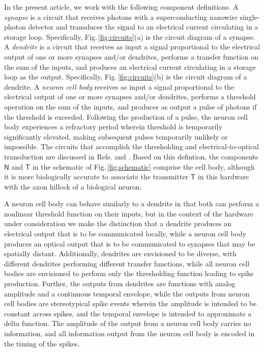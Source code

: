 \documentclass[twocolumn]{article}
\newcommand{\onlinecite}[1]{\hspace{-1 ex} \nocite{#1}\citenum{#1}}
\begin{document}
In the present article, we work with the following component definitions. A \textit{synapse} is a circuit that receives photons with a superconducting nanowire single-photon detector and transduces the signal to an electrical current circulating in a storage loop. Specifically, Fig.\,\ref{fig:circuits}(a) is the circuit diagram of a synapse. A \textit{dendrite} is a circuit that receives as input a signal proportional to the electrical output of one or more synapses and/or dendrites, performs a transfer function on the sum of the inputs, and produces an electrical current circulating in a storage loop as the output. Specifically, Fig.\,\ref{fig:circuits}(b) is the circuit diagram of a dendrite. A \textit{neuron cell body} receives as input a signal proportional to the electrical output of one or more synapses and/or dendrites, performs a threshold operation on the sum of the inputs, and produces as output a pulse of photons if the threshold is exceeded. Following the production of a pulse, the neuron cell body experiences a refractory period wherein threshold is temporarily significantly elevated, making subsequent pulses temporarily unlikely or impossible. The circuits that accomplish the thresholding and electrical-to-optical transduction are discussed in Refs.\onlinecite{sh2018} and \onlinecite{sh2018_full}. Based on this defintion, the components $\mathsf{N}$ and $\mathsf{T}$ in the schematic of Fig.\,\ref{fig:schematic} comprise the cell body, although it is more biologically accurate to associate the transmitter $\mathsf{T}$ in this hardware with the axon hillock of a biological neuron. 

A neuron cell body can behave similarly to a dendrite in that both can perform a nonlinear threshold function on their inputs, but in the context of the hardware under consideration we make the distinction that a dendrite produces an electrical output that is to be communicated locally, while a neuron cell body produces an optical output that is to be communicated to synapses that may be spatially distant. Additionally, dendrites are envisioned to be diverse, with different dendrites performing different transfer functions, while all neuron cell bodies are envisioned to perform only the thresholding function leading to spike production. Further, the outputs from dendrites are functions with analog amplitude and a continuous temporal envelope, while the outputs from neuron cell bodies are stereotypical spike events wherein the amplitude is intended to be constant across spikes, and the temporal envelope is intended to approximate a delta function. The amplitude of the output from a neuron cell body carries no information, and all information output from the neuron cell body is encoded in the timing of the spikes. 
\end{document}
